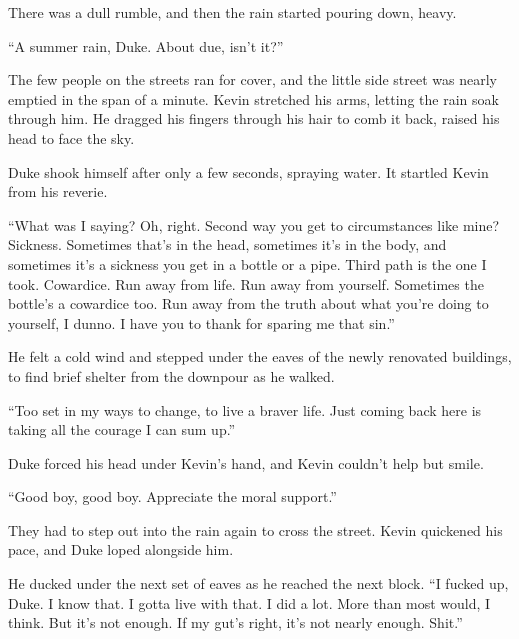 There was a dull rumble, and then the rain started pouring down, heavy.



``A summer rain, Duke.  About due, isn't it?''



The few people on the streets ran for cover, and the little side street was nearly emptied in the span of a minute.  Kevin stretched his arms, letting the rain soak through him.  He dragged his fingers through his hair to comb it back, raised his head to face the sky.



Duke shook himself after only a few seconds, spraying water.  It startled Kevin from his reverie.



``What was I saying?  Oh, right.  Second way you get to circumstances like mine?  Sickness.  Sometimes that's in the head, sometimes it's in the body, and sometimes it's a sickness you get in a bottle or a pipe.  Third path is the one I took.  Cowardice.  Run away from life.  Run away from yourself.  Sometimes the bottle's a cowardice too.  Run away from the truth about what you're doing to yourself, I dunno.  I have you to thank for sparing me that sin.''



He felt a cold wind and stepped under the eaves of the newly renovated buildings, to find brief shelter from the downpour as he walked.



``Too set in my ways to change, to live a braver life.  Just coming back here is taking all the courage I can sum up.''



Duke forced his head under Kevin's hand, and Kevin couldn't help but smile.



``Good boy, good boy.  Appreciate the moral support.''



They had to step out into the rain again to cross the street.  Kevin quickened his pace, and Duke loped alongside him.



He ducked under the next set of eaves as he reached the next block.  ``I fucked up, Duke.  I know that.  I gotta live with that.  I did a lot.  More than most would, I think.  But it's not enough.  If my gut's right, it's not nearly enough.  Shit.''



